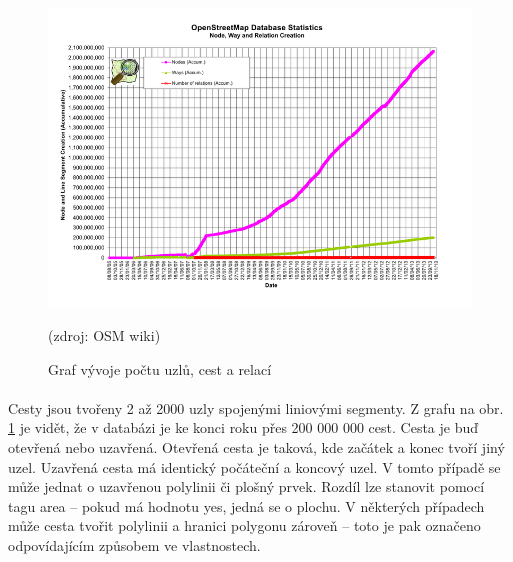 \documentclass[11pt,a4paper,titlepage,oneside]{book}
\begin{document}
		\begin{figure}[!h]
			\begin{center}
				\includegraphics[width=12cm]{obrazky/osm_stat_elements.png}
				\caption{Graf vývoje počtu uzlů, cest a relací}(zdroj: \ac{OSM} wiki\cite{osm_wiki_stats})
				\label{fig:elements}
			\end{center}
		\end{figure}


		\paragraph{} Cesty jsou tvořeny 2 až 2000 uzly spojenými liniovými segmenty. Z grafu na obr. \ref{fig:elements} je vidět, že v databázi je ke konci roku přes 200 000 000 cest.  Cesta je buď otevřená nebo uzavřená. Otevřená cesta je taková, kde začátek a konec tvoří jiný uzel. Uzavřená cesta má identický počáteční a koncový uzel. V tomto případě se může jednat o uzavřenou polylinii či plošný prvek. Rozdíl lze stanovit pomocí tagu area -- pokud má hodnotu yes, jedná se o plochu. V některých případech může cesta tvořit polylinii a hranici polygonu zároveň -- toto je pak označeno odpovídajícím způsobem ve vlastnostech.
\end{document}
